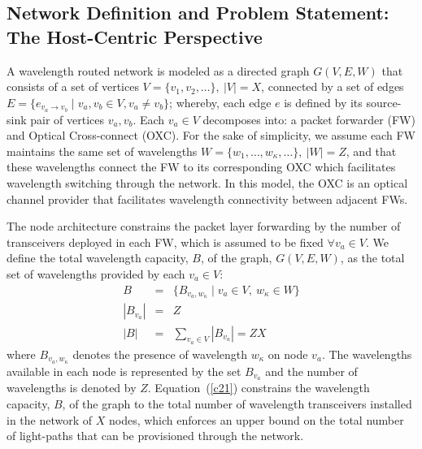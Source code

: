 \documentclass[journal]{IEEEtran}
\begin{document}
\subsection{Network Definition and Problem Statement: The Host-Centric Perspective}
A wavelength routed network is modeled as a directed graph $G(V,E,W)$
that consists of a set of vertices $V= \{v_1,v_2,\dots\}, \ |V|=X$,
connected by a set of edges $E= \{e_{v_a \rightarrow v_b}\mid v_a,v_b
\in V, v_a \neq v_b \}$; whereby, each edge $e$ is defined by its
source-sink pair of vertices $v_a,v_b$. Each $v_a \in V$ decomposes
into: a packet forwarder (FW) and Optical Cross-connect (OXC). For
the sake of simplicity, we assume each FW maintains the same set of
wavelengths $W= \{w_1,\dots,w_\kappa,\ldots\}, \ |W|=Z$, and that these
wavelengths connect the FW to its corresponding OXC which facilitates wavelength switching through the network. In this model, the OXC is an optical channel provider that facilitates wavelength connectivity between adjacent FWs.

The node architecture constrains the packet layer forwarding by the
number of transceivers deployed in each FW, which is assumed to be
fixed $\forall v_a \in V$. We define the total wavelength
capacity, $B$, of the graph, $G(V,E,W)$, as the total set of wavelengths provided by each $v_a \in V$:
\begin{eqnarray}
B & = & \{B_{v_a,w_\kappa} \mid v_a \in V, \ w_\kappa \in W\}\label{c11}
\\
|B_{v_a}| & = &  Z
\\
|B| & = & \sum_{v_a \in V} |B_{v_a}| = Z X\label{c21}
\end{eqnarray}
where $B_{v_a,w_\kappa}$ denotes the presence of wavelength $w_\kappa$
on node $v_a$. The wavelengths available in each node is represented
by the set $B_{v_a}$ and the number of wavelengths is denoted by $Z$.
Equation~(\ref{c21}) constrains the wavelength capacity, $B$, of the
graph to the total number of wavelength transceivers installed in the
network of $X$ nodes, which enforces an upper bound on the total number of light-paths that can be provisioned through the network. 
\end{document}
